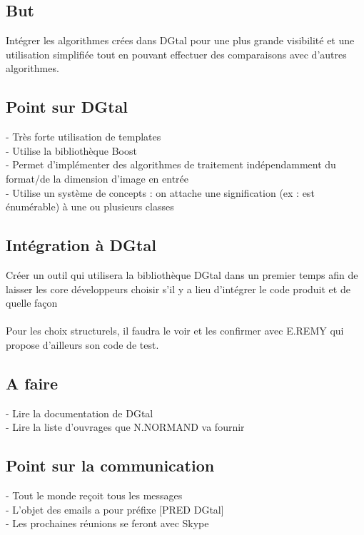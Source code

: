 \documentclass{article}
\begin{document}
\subsection{But }
Intégrer les algorithmes crées dans DGtal pour une plus grande visibilité et une utilisation simplifiée tout en pouvant effectuer des comparaisons avec d’autres algorithmes. \\

\subsection{Point sur DGtal }
-	Très forte utilisation de templates \\
-	Utilise la bibliothèque Boost \\
-	Permet d’implémenter des algorithmes de traitement indépendamment du format/de la dimension d’image en entrée \\
-	Utilise un système de concepts : on attache une signification (ex : est énumérable) à une ou plusieurs classes \\

\subsection{Intégration à DGtal }
Créer un outil qui utilisera la bibliothèque DGtal dans un premier temps afin de laisser les core développeurs choisir s’il y a lieu d’intégrer le code produit et de quelle façon \\
\\
Pour les choix structurels, il faudra le voir et les confirmer avec E.REMY qui propose d’ailleurs son code de test. \\

\subsection{A faire }
-	Lire la documentation de DGtal \\
-	Lire la liste d’ouvrages que N.NORMAND va fournir \\

\subsection{Point sur la communication }
-	Tout le monde reçoit tous les messages \\
-	L’objet des emails a pour préfixe [PRED DGtal] \\
-	Les prochaines réunions se feront avec Skype \\
\end{document}
